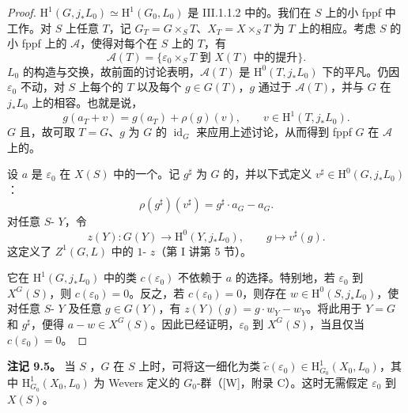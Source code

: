 \begin{proof}
 $\mathrm H^1(G,j_*L_0)\simeq\mathrm H^1(G_0,L_0)$ 是 III.1.1.2 中的。我们在 $S$ 上的小 fppf 中工作。对 $S$ 上任意 $T$，记 $G_T=G\times_ST$、$X_T=X\times_ST$ 为 $T$ 上的相应。考虑 $S$ 的小 fppf 上的 $\mathcal A$，使得对每个在 $S$ 上的 $T$，有
\[
\mathcal A(T)=\{\varepsilon_0\times_ST\text{ 到 }X(T)\text{ 中的提升}\}.
\]
$L_0$ 的构造与交换，故前面的讨论表明，$\mathcal A(T)$ 是 $\mathrm H^0(T,j_*L_0)$ 下的平凡。仍因 $\varepsilon_0$ 不动，对 $S$ 上每个的 $T$ 以及每个 $g\in G(T)$，$g$ 通过于 $\mathcal A(T)$，并与 $G$ 在 $j_*L_0$ 上的相容。也就是说，
\[
g(a_T+v)=g(a_T)+\rho(g)(v),\qquad v\in\mathrm H^1(T,j_*L_0).
\]
$G$ 且，故可取 $T=G$、$g$ 为 $G$ 的 $\operatorname{id}_G$ 来应用上述讨论，从而得到 fppf  $G$ 在 $\mathcal A$ 上的。

设 $a$ 是 $\varepsilon_0$ 在 $X(S)$ 中的一个。记 $g^\sharp$ 为 $G$ 的，并以下式定义 $v^\sharp\in\mathrm H^0(G,j_*L_0)$：
\[
\rho(g^\sharp)(v^\sharp)=g^\sharp\cdot a_G-a_G.
\]
对任意 $S$- $Y$，令
\[
z(Y):G(Y)\longrightarrow\mathrm H^0(Y,j_*L_0),\qquad g\longmapsto v^\sharp(g).
\]
这定义了 $Z^1(G,L)$ 中的 $1$- $z$（第 I 讲第 5 节）。

它在 $\mathrm H^1(G,j_*L_0)$ 中的类 $c(\varepsilon_0)$ 不依赖于 $a$ 的选择。特别地，若 $\varepsilon_0$ 到 $X^G(S)$，则 $c(\varepsilon_0)=0$。反之，若 $c(\varepsilon_0)=0$，则存在 $w\in\mathrm H^0(S,j_*L_0)$，使对任意 $S$- $Y$ 及任意 $g\in G(Y)$，有 $z(Y)(g)=g\cdot w_Y-w_Y$。将此用于 $Y=G$ 和 $g^\sharp$，便得 $a-w\in X^G(S)$。因此已经证明，$\varepsilon_0$ 到 $X^G(S)$，当且仅当 $c(\varepsilon_0)=0$。
\end{proof}
\textbf{注记 9.5。} 当 $S$ ，$G$ 在 $S$ 上时，可将这一细化为类 $\widetilde c(\varepsilon_0)\in\mathrm H^1_{G_0}(X_0,L_0)$，其中 $\mathrm H^1_{G_0}(X_0,L_0)$ 为 Wevers 定义的 $G_0$-群（[W]，附录 C）。这时无需假定 $\varepsilon_0$ 到 $X(S)$。

